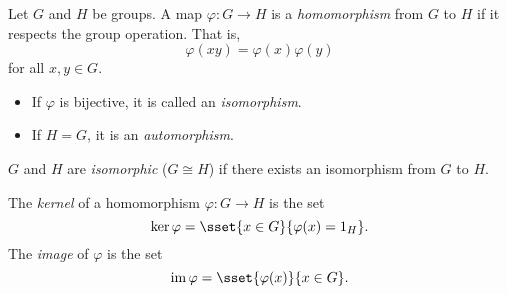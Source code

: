 \begin{definition*}[homomorphism] \label{def:group:homo}
    Let $G$ and $H$ be groups.
    A map $\varphi\colon G \to H$ is a \emph{homomorphism} from
    $G$ to $H$ if it respects the group operation.
    That is, \[
        \varphi(xy) = \varphi(x)\varphi(y)
    \] for all $x, y \in G$.

    \begin{itemize}
        \item If $\varphi$ is bijective, it is called an \emph{isomorphism}.
        \item If $H = G$, it is an \emph{automorphism}.
    \end{itemize}

    $G$ and $H$ are \emph{isomorphic} ($G \cong H$) if there exists an
    isomorphism from $G$ to $H$.
\end{definition*}

\begin{definition*}[kernel] \label{def:group:kernel}
    The \emph{kernel} of a homomorphism $\varphi\colon G \to H$ is the set
    \[
        \ker \varphi = \sset{x \in G}{\varphi(x) = 1_H}.
    \] The \emph{image} of $\varphi$ is the set \[
        \im \varphi = \sset{\varphi(x)}{x \in G}.
    \]
\end{definition*}

